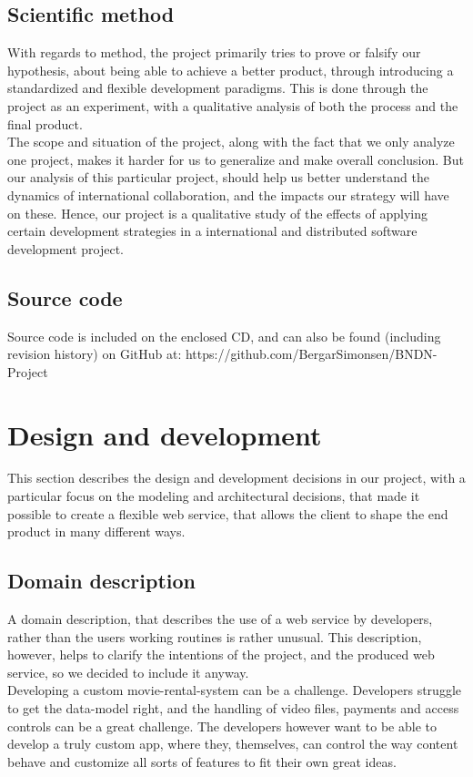 \documentclass[10pt,a4paper]{article}
\begin{document}
\subsection{Scientific method}
With regards to method, the project primarily tries to prove or falsify our hypothesis, about being able to achieve a better product, through introducing a standardized and flexible development paradigms. This is done through the project as an experiment, with a qualitative analysis of both the process and the final product. \\

The scope and situation of the project, along with the fact that we only analyze one project, makes it harder for us to generalize and make overall conclusion. But our analysis of this particular project, should help us better understand the dynamics of international collaboration, and the impacts our strategy will have on these. Hence, our project is a qualitative study of the effects of applying certain development strategies in a international and distributed software development project.

\subsection{Source code}
Source code is included on the enclosed CD, and can also be found (including revision history) on GitHub at: https://github.com/BergarSimonsen/BNDN-Project

\section{Design and development}
This section describes the design and development decisions in our project, with a particular focus on the modeling and architectural decisions, that made it possible to create a flexible web service, that allows the client to shape the end product in many different ways.

\subsection{Domain description}
A domain description, that describes the use of a web service by developers, rather than the users working routines is rather unusual. This description, however, helps to clarify the intentions of the project, and the produced web service, so we decided to include it anyway. \\

Developing a custom movie-rental-system can be a challenge. Developers struggle to get the data-model right, and the handling of video files, payments and access controls can be a great challenge. The developers however want to be able to develop a truly custom app, where they, themselves, can control the way content behave and customize all sorts of features to fit their own great ideas. \\
\end{document}
